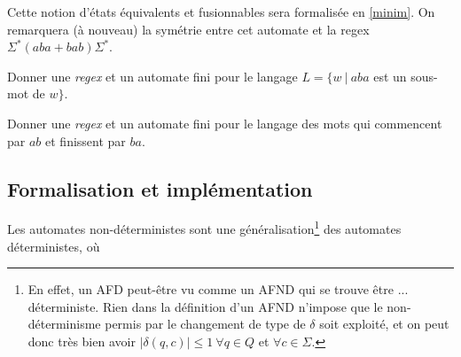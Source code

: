 \begin{example}
\begin{figure}[!ht]
\end{figure}
\newpage
Cette notion d'états équivalents et fusionnables sera formalisée en \ref{minim}. On remarquera (à nouveau) la symétrie entre cet automate et la regex $\Sigma^*(aba+bab)\Sigma^*$.

\end{example}

\begin{exercice}
Donner une \textit{regex} et un automate fini pour le langage $L = \{w ~|~ aba$ est un sous-mot de $w\}$.
\end{exercice}


\begin{exercice}
Donner une \textit{regex} et un automate fini pour le langage des mots qui commencent par $ab$ et finissent par $ba$.
\end{exercice}

\subsection{Formalisation et implémentation}

Les automates non-déterministes sont une généralisation\footnote{En effet, un AFD peut-être vu comme un AFND qui se trouve être ... déterministe. Rien dans la définition d'un AFND n'impose que le non-déterminisme permis par le changement de type de $\delta$ soit exploité, et on peut donc très bien avoir $|\delta(q,c)| \leq 1~\forall q \in Q$ et $\forall c \in \Sigma$.} des automates déterministes, où
 
